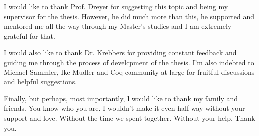 I would like to thank Prof. Dreyer for suggesting this topic and being my supervisor for the thesis.
However, he did much more than this, he supported and mentored me all the way through my Master's studies and I am extremely grateful for that.

I would also like to thank Dr. Krebbers for providing constant feedback and guiding me through the process of development of the thesis.
I'm also indebted to Michael Sammler, Ike Mudler and Coq community at large for fruitful discussions and helpful suggestions.

Finally, but perhaps, most importantly, I would like to thank my family and friends.
You know who you are.
I wouldn't make it even half-way without your support and love.
Without the time we spent together.
Without your help.
Thank you.


